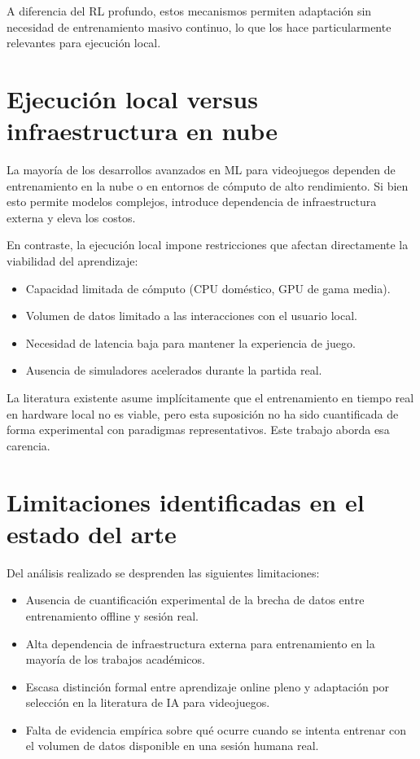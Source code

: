 A diferencia del RL profundo, estos mecanismos permiten adaptación sin necesidad de entrenamiento masivo continuo, lo que los hace particularmente relevantes para ejecución local.

\section{Ejecución local versus infraestructura en nube}

La mayoría de los desarrollos avanzados en ML para videojuegos dependen de entrenamiento en la nube o en entornos de cómputo de alto rendimiento. Si bien esto permite modelos complejos, introduce dependencia de infraestructura externa y eleva los costos.

En contraste, la ejecución local impone restricciones que afectan directamente la viabilidad del aprendizaje:

\begin{itemize}
    \item Capacidad limitada de cómputo (CPU doméstico, GPU de gama media).
    \item Volumen de datos limitado a las interacciones con el usuario local.
    \item Necesidad de latencia baja para mantener la experiencia de juego.
    \item Ausencia de simuladores acelerados durante la partida real.
\end{itemize}

La literatura existente asume implícitamente que el entrenamiento en tiempo real en hardware local no es viable, pero esta suposición no ha sido cuantificada de forma experimental con paradigmas representativos. Este trabajo aborda esa carencia.

\section{Limitaciones identificadas en el estado del arte}

Del análisis realizado se desprenden las siguientes limitaciones:

\begin{itemize}
    \item Ausencia de cuantificación experimental de la brecha de datos entre entrenamiento offline y sesión real.
    \item Alta dependencia de infraestructura externa para entrenamiento en la mayoría de los trabajos académicos.
    \item Escasa distinción formal entre aprendizaje online pleno y adaptación por selección en la literatura de IA para videojuegos.
    \item Falta de evidencia empírica sobre qué ocurre cuando se intenta entrenar con el volumen de datos disponible en una sesión humana real.
\end{itemize}


